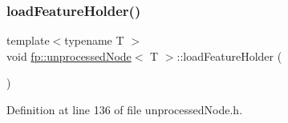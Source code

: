 \subsubsection{\texorpdfstring{load\+Feature\+Holder()}{loadFeatureHolder()}\hspace{0.1cm}{\footnotesize\ttfamily [1/2]}}
{\footnotesize\ttfamily template$<$typename T $>$ \\
void \hyperlink{classfp_1_1unprocessedNode}{fp\+::unprocessed\+Node}$<$ T $>$\+::load\+Feature\+Holder (\begin{DoxyParamCaption}{ }\end{DoxyParamCaption})\hspace{0.3cm}{\ttfamily [inline]}}



Definition at line 136 of file unprocessed\+Node.\+h.


